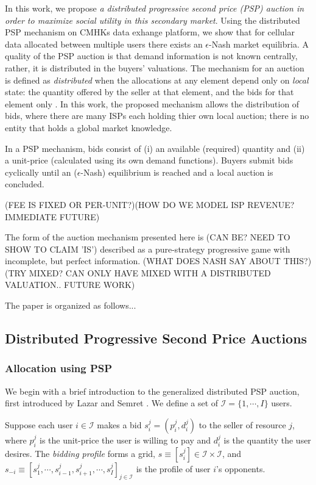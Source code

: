 \documentclass[12pt]{article}
\theoremstyle{definition}
\newcommand{\mcI}{\mathcal{I}}
\begin{document}
\begin{multicols}{2}
In this work, we propose \emph{a distributed progressive second price (PSP) auction in
order to maximize social utility in this secondary market}. Using the
distributed PSP mechanism on CMHKs data
exhange platform, we show that for cellular data allocated between multiple users there
exists an $\epsilon$-Nash market equilibria. A quality of the PSP auction is that
demand information is not known centrally, rather, it is distributed in the
buyers' valuations. The mechanism for an auction is defined
as \emph{distributed} when the allocations at any element depend only on
\emph{local} state: the quantity offered by the seller at that element, and the
bids for that element only \cite{lazar}. In this work, the proposed mechanism
allows the distribution of bids, where there are many ISPs each holding
thier own local auction; there is no entity that holds a global market knowledge.

In a PSP mechanism, bids consist of (i) an available (required) quantity and (ii) a unit-price (calculated
using its own demand functions). Buyers submit bids cyclically until an
($\epsilon$-Nash) equilibrium is reached and a local auction is concluded. 

(FEE IS FIXED OR
PER-UNIT?)(HOW DO WE MODEL ISP REVENUE? IMMEDIATE FUTURE)

The form of the auction mechanism presented here is (CAN BE? NEED TO SHOW TO
CLAIM 'IS') described as a
pure-strategy progressive game with incomplete, but perfect information. (WHAT
DOES NASH SAY ABOUT THIS?) (TRY MIXED? CAN ONLY HAVE MIXED WITH A DISTRIBUTED
VALUATION.. FUTURE WORK) 

The paper is organized as follows...

\subsection{Distributed Progressive Second Price Auctions}

\subsubsection{Allocation using PSP}

We begin with a brief introduction to the generalized distributed PSP auction, first introduced by Lazar and Semret \cite{lazar}.
We define a set of $\mcI = \lbrace 1,\cdots,I\rbrace$ users.

Suppose each user $i \in \mcI$ makes a bid $s_i^j = (p_i^j, d_i^j)$ to the
seller of resource $j$, where $p_i^j$ is the unit-price the user is willing to
pay and $d_i^j$ is the quantity the user desires. The \emph{bidding profile} forms a grid, $s \equiv
[s_i^j] \in \mcI \times \mcI$, and $s_{-i} \equiv [s_1^j , \cdots , s_{i-1}^j , s_{i+1}^j , \cdots
, s_I^j]_{j\in\mcI}$ is the profile of user $i$'s opponents. 


\end{multicols}
\end{document}
